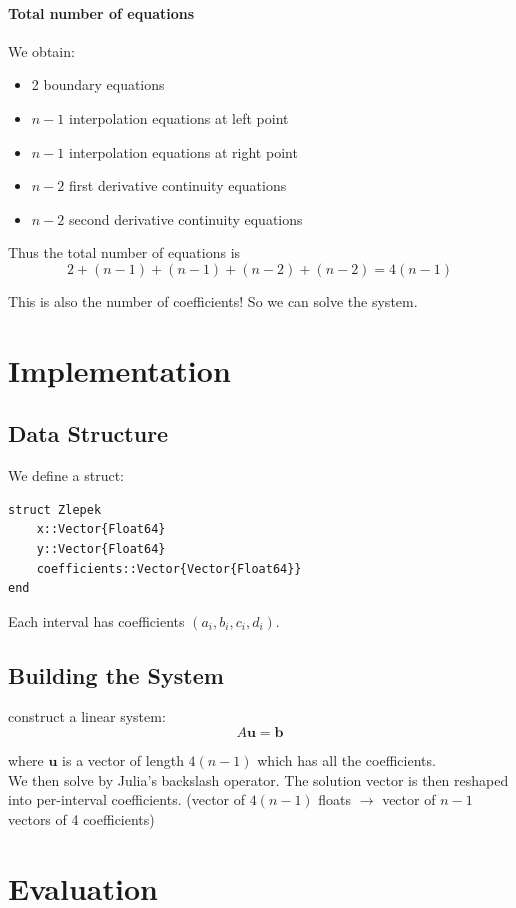 \documentclass[a4paper,11pt]{article}
\begin{document}
\paragraph{Total number of equations}

We obtain:
\begin{itemize}
    \item 2 boundary equations
    \item $n-1$ interpolation equations at left point 
    \item $n-1$ interpolation equations at right point
    \item $n-2$ first derivative continuity equations
    \item $n-2$ second derivative continuity equations
\end{itemize}

Thus the total number of equations is
\[
2 + (n-1) + (n-1) + (n-2) + (n-2) = 4(n-1)
\]

This is also the number of coefficients! So we can solve the system.
\section{Implementation}

\subsection{Data Structure}

We define a struct:
\begin{lstlisting}
struct Zlepek
    x::Vector{Float64}
    y::Vector{Float64}
    coefficients::Vector{Vector{Float64}}
end
\end{lstlisting}

Each interval has coefficients $(a_i, b_i, c_i, d_i)$.

\subsection{Building the System}
construct a linear system:
\[
A \mathbf{u} = \mathbf{b}
\]

where $\mathbf{u}$ is a vector of length $4(n-1)$ which has all the coefficients. \\ 
We then solve by Julia's backslash operator.
The solution vector is then reshaped into per-interval coefficients. (vector of $4(n-1)$ floats $\longrightarrow$ vector of $n-1$ vectors of 4 coefficients)

\section{Evaluation}
\end{document}

